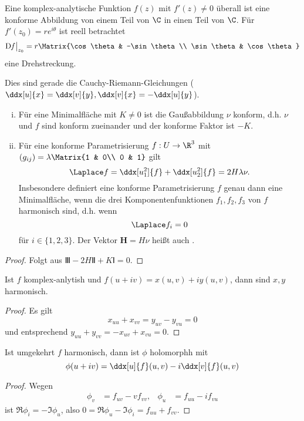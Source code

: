 \begin{nt}
	Eine komplex-analytische Funktion $f(z)$ mit $f'(z) \neq 0$ überall ist eine konforme Abbildung von einem Teil von $\C$ in einen Teil von $\C$. 
	Für $f'(z_0) = r e^{i\theta}$ ist reell betrachtet
	\[
		\Df \big|_{z_0} = r \Matrix{\cos \theta & -\sin \theta \\ \sin \theta & \cos \theta}
	\]
	eine Drehstreckung.

	Dies sind gerade die Cauchy-Riemann-Gleichungen ($\ddx[u]{x} = \ddx[v]{y}, \ddx[v]{x} = - \ddx[u]{y}$).
\end{nt}

\begin{kor}
	\begin{enumerate}[(i)]
		\item
			Für eine Minimalfläche mit $K \neq 0$ ist die Gaußabbildung $\nu$ konform, d.h. $\nu$ und $f$ sind konform zueinander und der konforme Faktor ist $-K$.
		\item
			Für eine konforme Parametrisierung $f: U \to \R^3$ mit $(g_{ij}) = \lambda \Matrix{1 & 0\\ 0 & 1}$ gilt
			\[
				\Laplace f = \ddx[u_1^2]{f} + \ddx[u_2^2]{f} = 2 H \lambda \nu.
			\]
			Insbesondere definiert eine konforme Parametrisierung $f$ genau dann eine Minimalfläche, wenn die drei Komponentenfunktionen $f_1, f_2, f_3$ von $f$ harmonisch sind, d.h. wenn
			\[
				\Laplace f_i = 0
			\]
			für $i \in \{1, 2, 3\}$.
			Der Vektor $\mathbf H = H \nu$ heißt auch .
	\end{enumerate}
	\begin{proof}
		Folgt aus $Ⅲ - 2HⅡ + KⅠ = 0$.
	\end{proof}
\end{kor}

\begin{kor}
	Ist $f$ komplex-anlytish und $f(u+iv) = x(u,v) + iy(u,v)$, dann sind $x, y$ harmonisch.
	\begin{proof}
		Es gilt
		\[
			x_{uu} + x_{vv} = y_{uv} - y_{vu} = 0
		\]
		und entsprechend $y_{uu} + y_{vv} = -x_{uv} + x_{vu} = 0$.
	\end{proof}
\end{kor}

\begin{st}
	Ist umgekehrt $f$ harmonisch, dann ist $\phi$ holomorphh mit
	\[
		\phi(u + iv) = \ddx[u]{f}(u,v) - i \ddx[v]{f}(u,v)
	\]
	\begin{proof}
		Wegen
		\begin{align*}
			\phi_v &= f_{uv} - v f_{vv}, &
			\phi_u &= f_{uu} - i f_{vu}
		\end{align*}
		ist $\Re \phi_i = - \Im \phi_u$, also $0 = \Re \phi_u - \Im \phi_i = f_{uu} + f_{vv}$. 
	\end{proof}	
\end{st}

